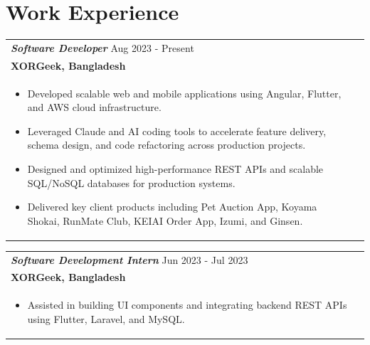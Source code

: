 \documentclass[a4paper,8pt]{article}
\begin{document}
\section{Work Experience}
\begin{tabularx}{\linewidth}{ @{}l r@{} }
\color[HTML]{371e77}\textbf{\textit{Software Developer}} \hfill \color[HTML]{371e77} Aug 2023 - Present \\[2pt]
\textbf{{XORGeek, Bangladesh}} \hfill \\[2pt]
\begin{minipage}[t]{\linewidth}
\begin{itemize}[nosep,after=\strut, leftmargin=1.5em, itemsep=1.5pt]
\item Developed scalable web and mobile applications using Angular, Flutter, and AWS cloud infrastructure.
\item Leveraged Claude and AI coding tools to accelerate feature delivery, schema design, and code refactoring across production projects.
\item Designed and optimized high-performance REST APIs and scalable SQL/NoSQL databases for production systems.
\item Delivered key client products including Pet Auction App, Koyama Shokai, RunMate Club, KEIAI Order App, Izumi, and Ginsen.
\end{itemize}
\end{minipage}
\end{tabularx}

\vspace{2.5pt}

\begin{tabularx}{\linewidth}{ @{}l r@{} }
\color[HTML]{371e77}\textbf{\textit{Software Development Intern}} \hfill \color[HTML]{371e77} Jun 2023 - Jul 2023 \\[2pt]
\textbf{{XORGeek, Bangladesh}} \hfill \\[2pt]
\begin{minipage}[t]{\linewidth}
\begin{itemize}[nosep,after=\strut, leftmargin=1.5em, itemsep=1.5pt]
\item Assisted in building UI components and integrating backend REST APIs using Flutter, Laravel, and MySQL.
\end{itemize}
\end{minipage}
\end{tabularx}

\vspace{2.5pt}
\end{document}

